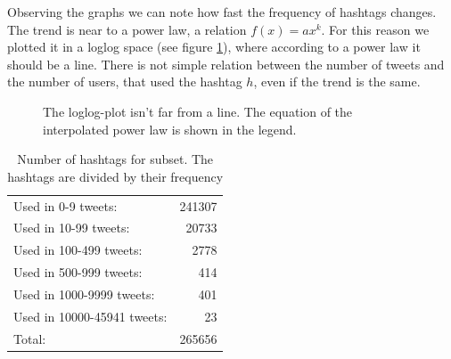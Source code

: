 \documentclass[a4paper,11pt,oneside]{article}
\begin{document}
Observing the graphs we can note how fast the frequency of hashtags changes. The trend is near to a power law, a relation $f(x) = ax^k$. For this reason we plotted it in a loglog space (see figure \ref{fig:loglogPlot}), where according to a power law it should be a line.
There is not simple relation between the number of tweets and the number of users, that used the hashtag $h$, even if the trend is the same.

\begin{figure}[h]
\centering
{}
\caption{The loglog-plot isn't far from a line. The equation of the interpolated power law is shown in the legend.}
\label{fig:loglogPlot}
\end{figure}


\begin{table}[h]
\centering
\small
\begin{tabular}[b]{l | r}
Used in 0-9 tweets:         & 241307 \\ %
Used in 10-99 tweets:       &  20733 \\ %
Used in 100-499 tweets:     &   2778 \\ %
Used in 500-999 tweets:     &    414 \\ %
Used in 1000-9999 tweets:   &    401 \\ %
Used in 10000-45941 tweets: &     23 \\ \hline
Total:	                      & 265656 \\
\end{tabular}
\caption{Number of hashtags for subset. The hashtags are divided by their frequency}
\end{table}
\end{document}
